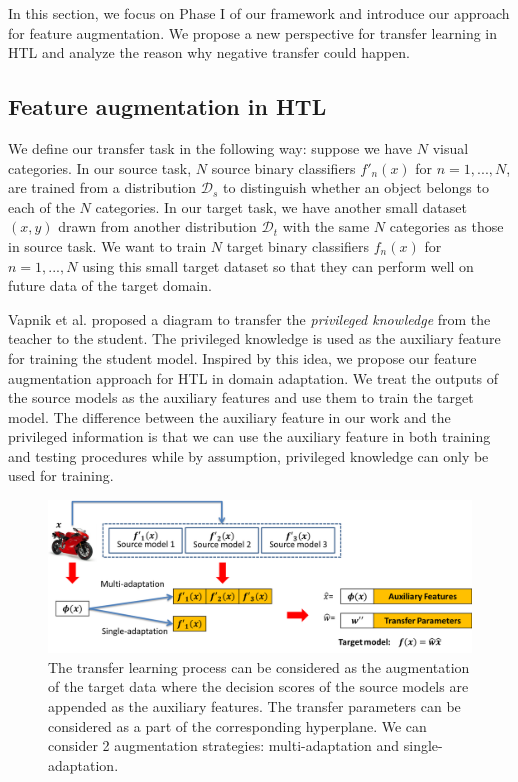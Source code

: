 In this section, we focus on Phase I of our framework and introduce our approach for feature augmentation. We propose a new perspective for transfer learning in HTL and analyze the reason why negative transfer could happen.

\subsection{Feature augmentation in HTL}
We define our transfer task in the following way: suppose we have $N$ visual categories. 
In our source task, $N$ source binary classifiers $f'_n(x)$ for $n=1,...,N$, are trained from a distribution $\mathcal{D}_s$ to distinguish whether an object belongs to each of the $N$ categories. In our target task, we have another small dataset $(x,y)$ drawn from another distribution $\mathcal{D}_t$ with the same $N$ categories as those in source task. We want to train $N$ target binary classifiers $f_n(x)$ for $n=1,...,N$ using this small target dataset so that they can perform well on future data of the target domain.

Vapnik et al. \cite{vapnik2015learning} proposed a diagram to transfer the \textit{privileged knowledge} from the teacher to the student. The privileged knowledge is used as the auxiliary feature for training the student model. Inspired by this idea, we propose our feature augmentation approach for HTL in domain adaptation. We treat the outputs of the source models as the auxiliary features and use them to train the target model. The difference between the auxiliary feature in our work and the privileged information is that we can use the auxiliary feature in both training and testing procedures while by assumption, privileged knowledge can only be used for training.

\begin{figure}
	\centering
	\includegraphics[scale=0.5]{fig/aug2.png}
	\caption{The transfer learning process can be considered as the augmentation of the target data where the decision scores of the source models are appended as the auxiliary features. The transfer parameters can be considered as a part of the corresponding hyperplane. We can consider 2 augmentation strategies: multi-adaptation and single-adaptation.}\label{fig:aug}
\end{figure}

